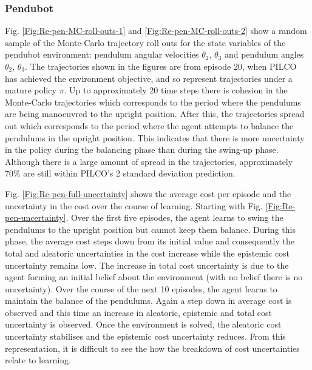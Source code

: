 \subsubsection{Pendubot}
Fig. \ref{Fig:Re-pen-MC-roll-outs-1} and \ref{Fig:Re-pen-MC-roll-outs-2} show a random sample of the Monte-Carlo trajectory roll outs for the state variables of the pendubot environment: pendulum angular velocities $\dot{\theta}_{2}$, $\dot{\theta}_{3}$ and pendulum angles $\theta_{2}$, $\theta_{3}$. The trajectories shown in the figures are from episode 20, when PILCO has achieved the environment objective, and so represent trajectories under a mature policy $\pi$. Up to approximately 20 time steps there is cohesion in the Monte-Carlo trajectories which corresponds to the period where the pendulums are being manoeuvred to the upright position. After this, the trajectories spread out which corresponds to the period where the agent attempts to balance the pendulums in the upright position. This indicates that there is more uncertainty in the policy during the balancing phase than during the swing-up phase. Although there is a large amount of spread in the trajectories, approximately $70\%$ are still within PILCO's 2 standard deviation prediction. 

Fig. \ref{Fig:Re-pen-full-uncertainty} shows the average cost per episode and the uncertainty in the cost over the course of learning. Starting with Fig. \ref{Fig:Re-pen-uncertainty}. Over the first five episodes, the agent learns to swing the pendulums to the upright position but cannot keep them balance. During this phase, the average cost steps down from its initial value and consequently the total and aleatoric uncertainties in the cost increase while the epistemic cost uncertainty remains low. The increase in total cost uncertainty is due to the agent forming an initial belief about the environment (with no belief there is no uncertainty). Over the course of the next 10 episodes, the agent learns to maintain the balance of the pendulums. Again a step down in average cost is observed and this time an increase in aleatoric, epistemic and total cost uncertainty is observed. Once the environment is solved, the aleatoric cost uncertainty stabilises and the epistemic cost uncertainty reduces. From this representation, it is difficult to see the how the breakdown of cost uncertainties relate to learning. 

